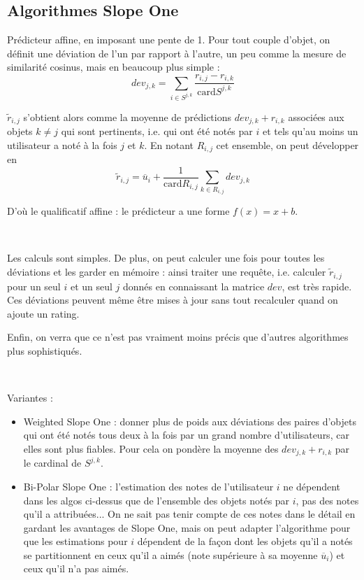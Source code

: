 \documentclass[11pt, openany, a4paper]{article}
\newcommand{\card}{\mathrm{card}}
\begin{document}
	\subsection{Algorithmes Slope One}
		Prédicteur affine, en imposant une pente de 1. Pour tout couple d'objet, on définit une déviation de l'un par rapport à l'autre, un peu comme la mesure de similarité cosinus, mais en beaucoup plus simple :
		$$dev_{j,k} = \sum\limits_{i\in S^{j,k}}
		\frac{r_{i,j}-r_{i,k}}{\card S^{j,k}}$$
		
		 $\tilde r_{i,j}$ s'obtient alors comme la moyenne de prédictions $dev_{j,k}+r_{i,k}$ associées aux objets $k\neq j$ qui sont pertinents, i.e. qui ont été notés par $i$ et tels qu'au moins un utilisateur a noté à la fois $j$ et $k$. En notant $R_{i,j}$ cet ensemble, on peut développer en
		 $$\tilde r_{i,j} = \overline u_i + \frac{1}{\card R_{i,j}} \sum\limits_{k\in R_{i,j}} dev_{j,k}$$
		 
		 D'où le qualificatif affine : le prédicteur a une forme $f(x)=x+b$.
	
		\
		
		Les calculs sont simples. De plus, on peut calculer une fois pour toutes les déviations et les garder en mémoire : ainsi traiter une requête, i.e. calculer $\tilde r_{i,j}$ pour un seul $i$ et un seul $j$ donnés en connaissant la matrice $dev$, est très rapide.  Ces déviations peuvent même être mises à jour sans tout recalculer quand on ajoute un rating.
		
		Enfin, on verra que ce n'est pas vraiment moins précis que d'autres algorithmes plus sophistiqués.
		
		\
		
		Variantes : 
		\begin{itemize}
		\item 
		Weighted Slope One : donner plus de poids aux déviations des paires d'objets qui ont été notés tous deux à la fois par un grand nombre d'utilisateurs, car elles sont plus fiables. Pour cela on pondère la moyenne des $dev_{j,k}+r_{i,k}$ par le cardinal de $S^{j,k}$.
		
		\item
		Bi-Polar Slope One : l'estimation des notes de l'utilisateur $i$ ne dépendent dans les algos ci-dessus que de l'ensemble des objets notés par $i$, pas des notes qu'il a attribuées... On ne sait pas tenir compte de ces notes dans le détail en gardant les avantages de Slope One, mais on peut adapter l'algorithme pour que les estimations pour $i$ dépendent de la façon dont les objets qu'il a notés se partitionnent en ceux qu'il a aimés (note supérieure à sa moyenne $\overline u_i$) et ceux qu'il n'a pas aimés.
		\end{itemize}
		
\end{document}
